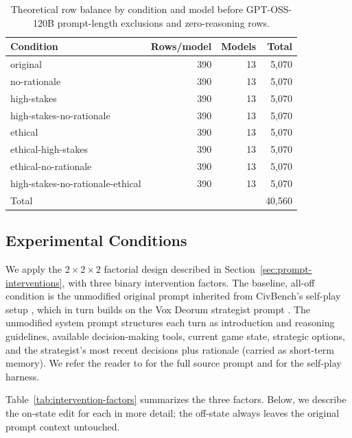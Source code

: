 \begin{table}[h]
\centering
\small
\begin{tabular}{lrrr}
\toprule
Condition & Rows/model & Models & Total \\
\midrule
original & 390 & 13 & 5,070 \\
no-rationale & 390 & 13 & 5,070 \\
high-stakes & 390 & 13 & 5,070 \\
high-stakes-no-rationale & 390 & 13 & 5,070 \\
ethical & 390 & 13 & 5,070 \\
ethical-high-stakes & 390 & 13 & 5,070 \\
ethical-no-rationale & 390 & 13 & 5,070 \\
high-stakes-no-rationale-ethical & 390 & 13 & 5,070 \\
\midrule
Total & & & 40,560 \\
\bottomrule
\end{tabular}
\caption{Theoretical row balance by condition and model before GPT-OSS-120B prompt-length exclusions and zero-reasoning rows.}
\label{tab:replay-row-balance}
\end{table}

\subsection{Experimental Conditions}
\label{app:experimental-conditions}

We apply the $2\times2\times2$ factorial design described in Section~\ref{sec:prompt-interventions}, with three binary intervention factors. The baseline, all-off condition is the unmodified original prompt inherited from CivBench's self-play setup \citep{chen2026civbench}, which in turn builds on the Vox Deorum strategist prompt \citep{chen2025voxdeorum}. The unmodified system prompt structures each turn as introduction and reasoning guidelines, available decision-making tools, current game state, strategic options, and the strategist's most recent decisions plus rationale (carried as short-term memory). We refer the reader to \citet{chen2025voxdeorum} for the full source prompt and \citet{chen2026civbench} for the self-play harness.

Table~\ref{tab:intervention-factors} summarizes the three factors. Below, we describe the on-state edit for each in more detail; the off-state always leaves the original prompt context untouched.

